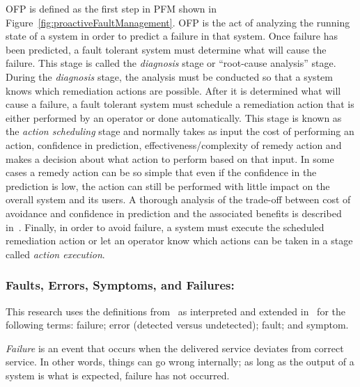 OFP is defined as the first step in PFM shown in
Figure~\ref{fig:proactiveFaultManagement}.  OFP is the act of analyzing the
running state of a system in order to predict a failure in that system. Once
failure has been predicted, a fault tolerant system must determine what will
cause the failure.  This stage is called the \emph{diagnosis} stage or
``root-cause analysis'' stage.  During the \emph{diagnosis} stage, the analysis
must be conducted so that a system knows which remediation actions are
possible.  After it is determined what will cause a failure, a fault tolerant
system must schedule a remediation action that is either performed by an
operator or done automatically.  This stage is known as the \emph{action
scheduling} stage and normally takes as input the cost of performing an action,
confidence in prediction, effectiveness/complexity of remedy action and makes a
decision about what action to perform based on that input.  In some cases a
remedy action can be so simple that even if the confidence in the prediction is
low, the action can still be performed with little impact on the overall system
and its users.  A thorough analysis of the trade-off between cost of avoidance
and confidence in prediction and the associated benefits is described
in~\cite{candea2004microreboot}.  Finally, in order to avoid failure, a system
must execute the scheduled remediation action or let an operator know which
actions can be taken in a stage called \emph{action execution}.

\subsubsection{Faults, Errors, Symptoms, and Failures:}
This research uses the definitions from~\cite{avivzienis2004basic} as
interpreted and extended in~\cite{salfnerSurvey} for the following terms:
failure; error (detected versus undetected); fault; and symptom.

\emph{Failure} is an event that occurs when the delivered service deviates from
correct service.  In other words, things can go wrong internally; as long as
the output of a system is what is expected, failure has not occurred.  

